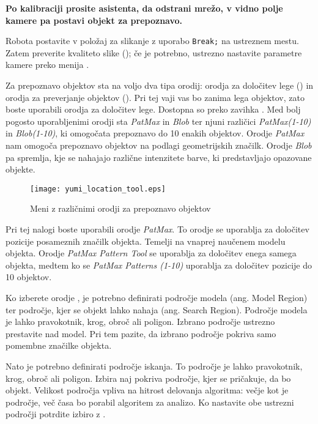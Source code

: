 \begin{mdframed}[backgroundcolor=red!20, shadow=true,roundcorner=8pt]
\textbf{Po kalibraciji prosite asistenta, da odstrani mrežo, v vidno polje kamere pa postavi objekt za prepoznavo.}
\end{mdframed}

Robota postavite v položaj za slikanje z uporabo \verb"Break;" na ustreznem mestu. Zatem preverite kvaliteto slike (); če je potrebno, ustrezno nastavite parametre kamere preko menija .

Za prepoznavo objektov sta na voljo dva tipa orodij: orodja za določitev lege () in orodja za preverjanje objektov (). Pri tej vaji vas bo zanima lega objektov, zato boste uporabili orodja za določitev lege. Dostopna so preko zavihka . Med bolj pogosto uporabljenimi orodji sta {\emph{PatMax}} in {\emph{Blob}} ter njuni različici {\emph{PatMax(1-10)}} in {\emph{Blob(1-10)}}, ki omogočata prepoznavo do 10 enakih objektov. Orodje {\emph{PatMax}} nam omogoča prepoznavo objektov na podlagi geometrijskih značilk. Orodje {\emph{Blob}} pa spremlja, kje se nahajajo različne intenzitete barve, ki predstavljajo opazovane objekte.

\begin{figure}[!hbt]
\centering
\texttt{[image: yumi\_location\_tool.eps]}
\caption{Meni z različnimi orodji za prepoznavo objektov}
\label{fig:yumi_location_tool}
\end{figure}

Pri tej nalogi boste uporabili orodje {\emph{PatMax}}. To orodje se uporablja za določitev pozicije posameznih značilk objekta. Temelji na vnaprej naučenem modelu objekta. Orodje {\emph{PatMax Pattern Tool}} se uporablja za določitev enega samega objekta, medtem ko se {\emph{PatMax Patterns (1-10)}} uporablja za določitev pozicije do 10 objektov.

Ko izberete orodje , je potrebno definirati področje modela (ang. Model Region) ter področje, kjer se objekt lahko nahaja (ang. Search Region). Področje modela je lahko pravokotnik, krog, obroč ali poligon. Izbrano področje ustrezno prestavite nad model. Pri tem pazite, da izbrano področje pokriva samo pomembne značilke objekta.

Nato je potrebno definirati področje iskanja. To področje je lahko pravokotnik, krog, obroč ali poligon. Izbira naj pokriva področje, kjer se pričakuje, da bo objekt. Velikost področja vpliva na hitrost delovanja algoritma: večje kot je področje, več časa bo porabil algoritem za analizo. Ko nastavite obe ustrezni področji potrdite izbiro z .

